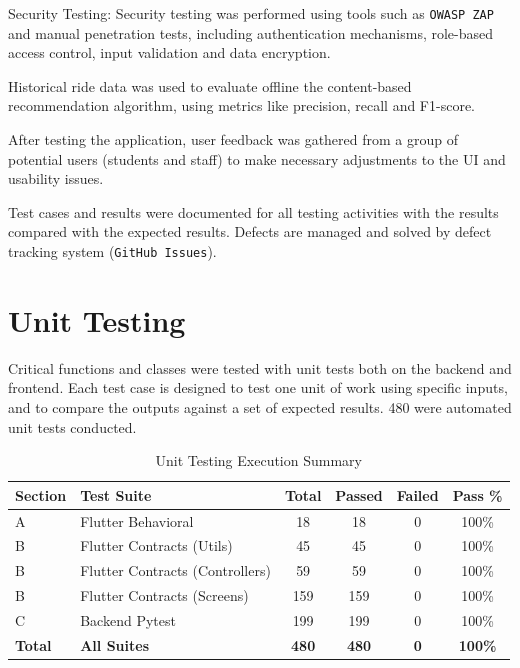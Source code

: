 Security Testing: Security testing was performed using tools such as \texttt{OWASP ZAP} and manual penetration tests, including authentication mechanisms, role-based access control, input validation and data encryption.

Historical ride data was used to evaluate offline the content-based recommendation algorithm, using metrics like precision, recall and F1-score.

After testing the application, user feedback was gathered from a group of potential users (students and staff) to make necessary adjustments to the UI and usability issues.

Test cases and results were documented for all testing activities with the results compared with the expected results. Defects are managed and solved by defect tracking system (\texttt{GitHub Issues}).


\section{Unit Testing}

Critical functions and classes were tested with unit tests both on the backend and frontend. Each test case is designed to test one unit of work using specific inputs, and to compare the outputs against a set of expected results. 480 were automated unit tests conducted.

\begin{table}[H]
\centering
\caption{Unit Testing Execution Summary}
\renewcommand{\arraystretch}{1.3}
\begin{tabularx}{\textwidth}{|l|X|c|c|c|c|}
\hline
\textbf{Section} & \textbf{Test Suite} & \textbf{Total} & \textbf{Passed} & \textbf{Failed} & \textbf{Pass \%} \\
\hline
A & Flutter Behavioral & 18 & 18 & 0 & 100\% \\
\hline
B & Flutter Contracts (Utils) & 45 & 45 & 0 & 100\% \\
\hline
B & Flutter Contracts (Controllers) & 59 & 59 & 0 & 100\% \\
\hline
B & Flutter Contracts (Screens) & 159 & 159 & 0 & 100\% \\
\hline
C & Backend Pytest & 199 & 199 & 0 & 100\% \\
\hline
\rowcolor{gray!15} \textbf{Total} & \textbf{All Suites} & \textbf{480} & \textbf{480} & \textbf{0} & \textbf{100\%} \\
\hline
\end{tabularx}
\end{table}


